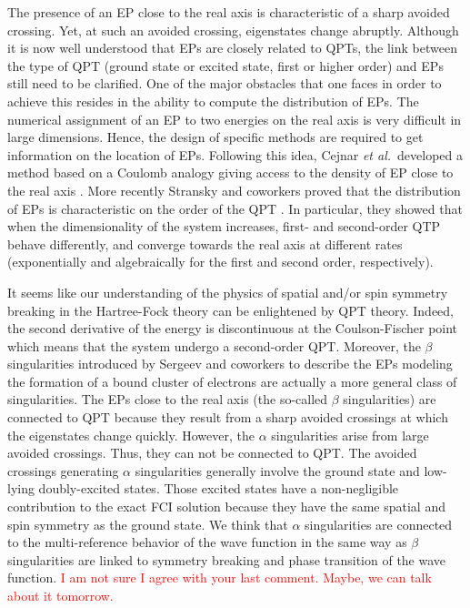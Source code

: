 \documentclass[11pt,a4paper]{article}
\newcommand{\titou}[1]{\textcolor{red}{#1}}
\begin{document}
The presence of an EP close to the real axis is characteristic of a sharp avoided crossing. Yet, at such an avoided crossing, eigenstates change abruptly. Although it is now well understood that EPs are closely related to QPTs, the link between the type of QPT (ground state or excited state, first or higher order) and EPs still need to be clarified. One of the major obstacles that one faces in order to achieve this resides in the ability to compute the distribution of EPs. The numerical assignment of an EP to two energies on the real axis is very difficult in large dimensions. Hence, the design of specific methods are required to get information on the location of EPs. Following this idea, Cejnar \textit{et al.}~developed a method based on a Coulomb analogy giving access to the density of EP close to the real axis \cite{Cejnar_2005, Cejnar_2007}. More recently Stransky and coworkers proved that the distribution of EPs is characteristic on the order of the QPT \cite{Stransky_2018}. In particular, they showed that when the dimensionality of the system increases, first- and second-order QTP behave differently, and converge towards the real axis at different rates (exponentially and algebraically for the first and second order, respectively).

It seems like our understanding of the physics of spatial and/or spin symmetry breaking in the Hartree-Fock theory can be enlightened by QPT theory. Indeed, the second derivative of the energy is discontinuous at the Coulson-Fischer point which means that the system undergo a second-order QPT. Moreover, the $\beta$ singularities introduced by Sergeev and coworkers to describe the EPs modeling the formation of a bound cluster of electrons are actually a more general class of singularities. The EPs close to the real axis (the so-called $\beta$ singularities) are connected to QPT because they result from a sharp avoided crossings at which the eigenstates change quickly. However, the $\alpha$ singularities arise from large avoided crossings. Thus, they can not be connected to QPT. The avoided crossings generating $\alpha$ singularities generally involve the ground state and low-lying doubly-excited states. Those excited states have a non-negligible contribution to the exact FCI solution because they have the same spatial and spin symmetry as the ground state. We think that $\alpha$ singularities are connected to the multi-reference behavior of the wave function in the same way as $\beta$ singularities are linked to symmetry breaking and phase transition of the wave function. 
\titou{I am not sure I agree with your last comment. Maybe, we can talk about it tomorrow.}
\end{document}
